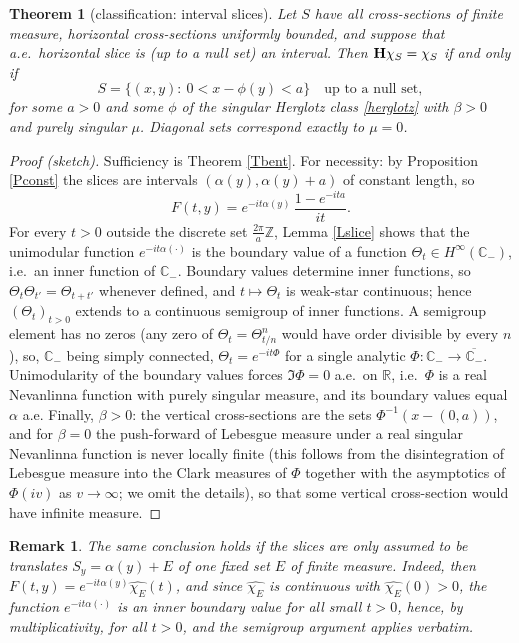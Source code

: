 \documentclass{article}
\newtheorem{theorem}{Theorem}
\newtheorem{remark}{Remark}
\def\H{{\bf H}}
\def\R{{\mathbb R}}
\def\C{{\mathbb C}}
\def\Z{{\mathbb Z}}
\begin{document}
	\begin{theorem}[classification: interval slices]\label{Tinterval}
		Let $S$ have all cross-sections of finite measure, horizontal cross-sections uniformly bounded, and suppose that a.e.\ horizontal slice is (up to a null set) an interval. Then $\H\chi_S=\chi_S$ if and only if
		$$S=\{(x,y):\ 0<x-\phi(y)<a\}\quad\text{up to a null set},$$
		for some $a>0$ and some $\phi$ of the singular Herglotz class \eqref{herglotz} with $\beta>0$ and purely singular $\mu$. Diagonal sets correspond exactly to $\mu=0$.
	\end{theorem}

	\begin{proof}[Proof (sketch)]
		Sufficiency is Theorem \ref{Tbent}. For necessity: by Proposition \ref{Pconst} the slices are intervals $(\alpha(y),\alpha(y)+a)$ of constant length, so
		$$F(t,y)=e^{-it\alpha(y)}\,\frac{1-e^{-ita}}{it}.$$
		For every $t>0$ outside the discrete set $\frac{2\pi}a\Z$, Lemma \ref{Lslice} shows that the unimodular function $e^{-it\alpha(\cdot)}$ is the boundary value of a function $\Theta_t\in H^\infty(\C_-)$, i.e.\ an inner function of $\C_-$. Boundary values determine inner functions, so $\Theta_t\Theta_{t'}=\Theta_{t+t'}$ whenever defined, and $t\mapsto\Theta_t$ is weak-star continuous; hence $(\Theta_t)_{t>0}$ extends to a continuous semigroup of inner functions. A semigroup element has no zeros (any zero of $\Theta_t=\Theta_{t/n}^n$ would have order divisible by every $n$), so, $\C_-$ being simply connected, $\Theta_t=e^{-it\Phi}$ for a single analytic $\Phi:\C_-\to\overline{\C_-}$. Unimodularity of the boundary values forces $\Im\Phi=0$ a.e.\ on $\R$, i.e.\ $\Phi$ is a real Nevanlinna function with purely singular measure, and its boundary values equal $\alpha$ a.e. Finally, $\beta>0$: the vertical cross-sections are the sets $\Phi^{-1}(x-(0,a))$, and for $\beta=0$ the push-forward of Lebesgue measure under a real singular Nevanlinna function is never locally finite (this follows from the disintegration of Lebesgue measure into the Clark measures of $\Phi$ together with the asymptotics of $\Phi(iv)$ as $v\to\infty$; we omit the details), so that some vertical cross-section would have infinite measure.
	\end{proof}

	\begin{remark}
		The same conclusion holds if the slices are only assumed to be translates $S_y=\alpha(y)+E$ of one fixed set $E$ of finite measure. Indeed, then $F(t,y)=e^{-it\alpha(y)}\widehat{\chi_E}(t)$, and since $\widehat{\chi_E}$ is continuous with $\widehat{\chi_E}(0)>0$, the function $e^{-it\alpha(\cdot)}$ is an inner boundary value for all small $t>0$, hence, by multiplicativity, for all $t>0$, and the semigroup argument applies verbatim.
	\end{remark}
\end{document}
